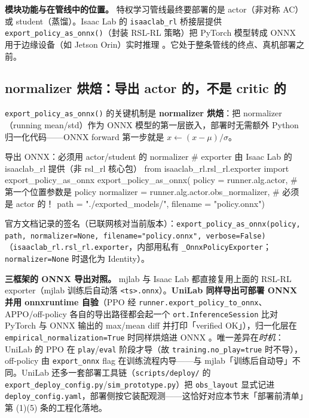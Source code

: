 \textbf{模块功能与在管线中的位置。} 特权学习管线最终要部署的是 actor（非对称 AC）或 student（蒸馏）。Isaac Lab 的 \verb|isaaclab_rl| 桥接层提供 \verb|export_policy_as_onnx()|（封装 RSL-RL 策略）把 PyTorch 模型转成 ONNX 用于边缘设备（如 Jetson Orin）实时推理 \cite{schwarke2025rslrl}。它处于整条管线的终点、真机部署之前。

\subsection{normalizer 烘焙：导出 actor 的，不是 critic 的}
\label{sec:rlmc-priv-norm}

\verb|export_policy_as_onnx()| 的关键机制是 \textbf{normalizer 烘焙}：把 normalizer（running mean/std）作为 ONNX 模型的第一层嵌入，部署时无需额外 Python 归一化代码——ONNX forward 第一步就是 $x\leftarrow(x-\mu)/\sigma$。

\begin{codebox}[Python]{导出 ONNX：必须用 actor/student 的 normalizer}
# exporter 由 Isaac Lab 的 isaaclab_rl 提供（非 rsl_rl 核心包）
from isaaclab_rl.rsl_rl.exporter import export_policy_as_onnx
export_policy_as_onnx(
    policy     = runner.alg.actor,                   # 第一个位置参数是 policy
    normalizer = runner.alg.actor.obs_normalizer,    # 必须是 actor 的！
    path       = "./exported_models/",
    filename   = "policy.onnx")
\end{codebox}

官方文档记录的签名（已联网核对当前版本）：\verb|export_policy_as_onnx(policy, path, normalizer=None, filename="policy.onnx", verbose=False)|（\texttt{isaaclab\_rl.rsl\_rl.exporter}，内部用私有 \verb|_OnnxPolicyExporter|；\verb|normalizer=None| 时退化为 Identity）。

\textbf{三框架的 ONNX 导出对照。} mjlab 与 Isaac Lab 都直接复用上面的 RSL-RL exporter（mjlab 训练后自动落 \verb|<ts>.onnx|）。\textbf{UniLab 同样导出可部署 ONNX 并用 onnxruntime 自验}（PPO 经 \verb|runner.export_policy_to_onnx|、APPO/off-policy 各自的导出路径都会起一个 \verb|ort.InferenceSession| 比对 PyTorch 与 ONNX 输出的 max/mean diff 并打印「verified OK」），归一化层在 \verb|empirical_normalization=True| 时同样烘焙进 ONNX \cite{unilab2026}。唯一差异在\emph{时机}：UniLab 的 PPO 在 \verb|play|/\verb|eval| 阶段才导（故 \verb|training.no_play=true| 时不导），off-policy 由 \verb|export_onnx| flag 在训练流程内导——与 mjlab「训练后自动导」不同。UniLab 还多一套部署工具链（\verb|scripts/deploy/| 的 \verb|export_deploy_config.py|/\verb|sim_prototype.py|）把 \verb|obs_layout| 显式记进 \verb|deploy_config.yaml|，部署侧按它装配观测——这恰好对应本节末「部署前清单」第 (1)(5) 条的工程化落地。

